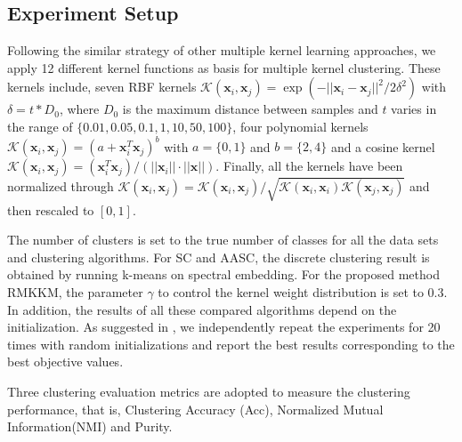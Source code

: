 \documentclass{article}
\begin{document}
\subsection{Experiment Setup}
Following the similar strategy of other multiple kernel learning approaches, we apply 12 different kernel functions as basis for multiple kernel clustering. These kernels include, seven RBF kernels $\mathcal{K}(\bm{x}_i, \bm{x}_j) = \exp(-||\bm{x}_i -  \bm{x}_j||^2 /2 \delta^2)$ with $\delta = t * D_0$, where $D_0$ is the maximum distance between samples and $t$ varies in the range of $\{0.01, 0.05, 0.1, 1, 10, 50, 100\}$, four polynomial kernels $\mathcal{K}(\bm{x}_i, \bm{x}_j) = (a + \bm{x}_i^T \bm{x}_j)^b$ with $a = \{0, 1\}$ and $b = \{2, 4\}$ and a cosine kernel $\mathcal{K}(\bm{x}_i, \bm{x}_j) = (\bm{x}_i^T \bm{x}_j)/(||\bm{x}_i||\cdot|| \bm{x}||)$. Finally, all the kernels have been normalized through $\mathcal{K}(\bm{x}_i, \bm{x}_j) = \mathcal{K}(\bm{x}_i, \bm{x}_j)/\sqrt{\mathcal{K}(\bm{x}_i, \bm{x}_i)\mathcal{K}(\bm{x}_j, \bm{x}_j)}$ and then rescaled to $[0,1]$.

The number of clusters is set to the true number of classes for all the data sets and clustering algorithms. For SC and AASC, the discrete clustering result is obtained by running k-means on spectral embedding. For the proposed method RMKKM,  the parameter $\gamma$ to control the kernel weight distribution is set to 0.3. In addition, the results of all these compared algorithms depend on the initialization. As suggested in \cite{yang2010image}, we independently repeat the experiments for 20 times with random initializations and report the best results corresponding to the best objective values.

Three clustering evaluation metrics are adopted to measure the clustering performance, that is, Clustering Accuracy (Acc), Normalized Mutual Information(NMI) and Purity.
\end{document}
